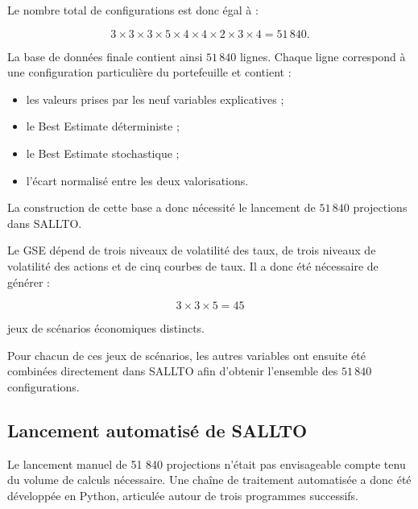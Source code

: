 Le nombre total de configurations est donc égal à :

\begin{equation}
    3 \times 3 \times 3 \times 5 \times 4
    \times 4 \times 2 \times 3 \times 4
    = 51\,840.
\end{equation}

La base de données finale contient ainsi \(51\,840\) lignes. Chaque ligne correspond à une configuration particulière du portefeuille et contient :

\begin{itemize}[label=\textemdash, nosep, leftmargin=2.5em]
    \item les valeurs prises par les neuf variables explicatives ;
    \item le Best Estimate déterministe ;
    \item le Best Estimate stochastique ;
    \item l'écart normalisé entre les deux valorisations.
\end{itemize}

La construction de cette base a donc nécessité le lancement de \(51\,840\) projections dans SALLTO.

Le GSE dépend de trois niveaux de volatilité des taux, de trois niveaux de volatilité des actions et de cinq courbes de taux. Il a donc été nécessaire de générer :

\begin{equation}
    3 \times 3 \times 5 = 45
\end{equation}

jeux de scénarios économiques distincts.

Pour chacun de ces jeux de scénarios, les autres variables ont ensuite été combinées directement dans SALLTO afin d'obtenir l'ensemble des \(51\,840\) configurations.



\subsection{Lancement automatisé de SALLTO}

Le lancement manuel de 51 840 projections n'était pas envisageable compte tenu du volume de calculs nécessaire. Une chaîne de traitement automatisée a donc été développée en Python, articulée autour de trois programmes successifs.

